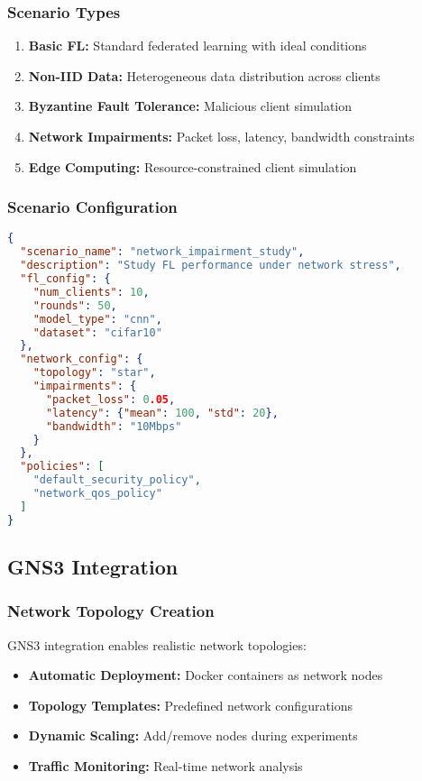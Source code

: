 \documentclass[12pt,a4paper,twoside]{article}
\begin{document}
\subsubsection{Scenario Types}

\begin{enumerate}
    \item \textbf{Basic FL:} Standard federated learning with ideal conditions
    \item \textbf{Non-IID Data:} Heterogeneous data distribution across clients
    \item \textbf{Byzantine Fault Tolerance:} Malicious client simulation
    \item \textbf{Network Impairments:} Packet loss, latency, bandwidth constraints
    \item \textbf{Edge Computing:} Resource-constrained client simulation
\end{enumerate}

\subsubsection{Scenario Configuration}

\begin{lstlisting}[language=json, caption=Scenario Configuration Example]
{
  "scenario_name": "network_impairment_study",
  "description": "Study FL performance under network stress",
  "fl_config": {
    "num_clients": 10,
    "rounds": 50,
    "model_type": "cnn",
    "dataset": "cifar10"
  },
  "network_config": {
    "topology": "star",
    "impairments": {
      "packet_loss": 0.05,
      "latency": {"mean": 100, "std": 20},
      "bandwidth": "10Mbps"
    }
  },
  "policies": [
    "default_security_policy",
    "network_qos_policy"
  ]
}
\end{lstlisting}

\subsection{GNS3 Integration}

\subsubsection{Network Topology Creation}

GNS3 integration enables realistic network topologies:

\begin{itemize}
    \item \textbf{Automatic Deployment:} Docker containers as network nodes
    \item \textbf{Topology Templates:} Predefined network configurations
    \item \textbf{Dynamic Scaling:} Add/remove nodes during experiments
    \item \textbf{Traffic Monitoring:} Real-time network analysis
\end{itemize}
\end{document}
